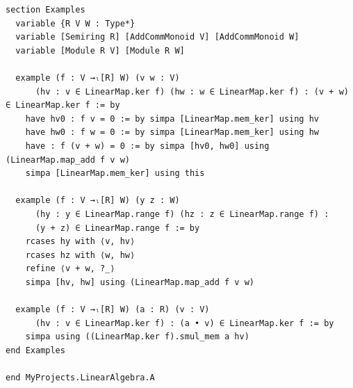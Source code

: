 \documentclass[12pt]{article}
\begin{document}
\begin{lstlisting}
section Examples
  variable {R V W : Type*}
  variable [Semiring R] [AddCommMonoid V] [AddCommMonoid W]
  variable [Module R V] [Module R W]

  example (f : V →ₗ[R] W) (v w : V)
      (hv : v ∈ LinearMap.ker f) (hw : w ∈ LinearMap.ker f) : (v + w) ∈ LinearMap.ker f := by
    have hv0 : f v = 0 := by simpa [LinearMap.mem_ker] using hv
    have hw0 : f w = 0 := by simpa [LinearMap.mem_ker] using hw
    have : f (v + w) = 0 := by simpa [hv0, hw0] using (LinearMap.map_add f v w)
    simpa [LinearMap.mem_ker] using this

  example (f : V →ₗ[R] W) (y z : W)
      (hy : y ∈ LinearMap.range f) (hz : z ∈ LinearMap.range f) :
      (y + z) ∈ LinearMap.range f := by
    rcases hy with ⟨v, hv⟩
    rcases hz with ⟨w, hw⟩
    refine ⟨v + w, ?_⟩
    simpa [hv, hw] using (LinearMap.map_add f v w)

  example (f : V →ₗ[R] W) (a : R) (v : V)
      (hv : v ∈ LinearMap.ker f) : (a • v) ∈ LinearMap.ker f := by
    simpa using ((LinearMap.ker f).smul_mem a hv)
end Examples

end MyProjects.LinearAlgebra.A

\end{lstlisting}
\end{document}
